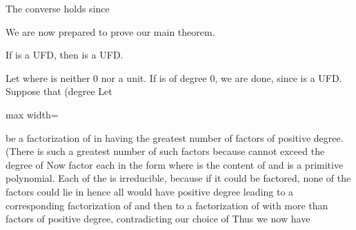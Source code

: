 \documentclass[11pt,oneside]{article}
\begin{document}
\begin{BookBody}
The converse holds since  \BookEnd{\blacklozenge}

\noindent We are now prepared to prove our main theorem.

 If  is a UFD, then  is a UFD.

 Let  where  is neither 0 nor a unit. If  is of degree 0, we are done, since  is a UFD. Suppose that (degree  Let

\begin{center}\begin{adjustbox}{max width=\linewidth}\end{adjustbox}\end{center}

\noindent be a factorization of  in  having the greatest number  of factors of positive degree. (There is such a greatest number of such factors because  cannot exceed the degree of  Now factor each  in the form  where  is the content 
of  and  is a primitive polynomial. Each of the  is irreducible, because if it could be factored, none of the factors could lie in  hence all would have positive degree leading to a corresponding factorization of  and then to a factorization of  with more than  factors of positive degree, contradicting our choice of  Thus we now have

\end{BookBody}

\BookNarrativetrue
\end{document}
